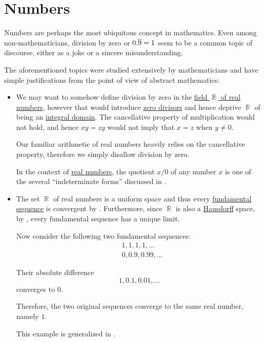 \chapter{Numbers}\label{ch:numbers}

Numbers are perhaps the most ubiquitous concept in mathematics. Even among non-mathematicians, division by zero or \( 0.\oline{9} = 1 \) seem to be a common topic of discourse, either as a joke or a sincere misunderstanding.

The aforementioned topics were studied extensively by mathematicians and have simple justifications from the point of view of abstract mathematics:
\begin{itemize}
  \item We may want to somehow define division by zero in the \hyperref[def:real_numbers]{field \( \BbbR \) of real numbers}, however that would introduce \hyperref[def:divisibility/zero]{zero divisors} and hence deprive \( \BbbR \) of being an \hyperref[def:integral_domain]{integral domain}. The cancellative property of multiplication would not hold, and hence \( xy = zy \) would not imply that \( x = z \) when \( y \neq 0 \).

  Our familiar arithmetic of real numbers heavily relies on the cancellative property, therefore we simply disallow division by zero.

  In the context of \hyperref[def:real_numbers]{real numbers}, the quotient \( x / 0 \) of any number \( x \) is one of the several \enquote{indeterminate forms} discussed in .

  \item The set \( \BbbR \) of real numbers is a uniform space and thus every \hyperref[def:fundamental_net]{fundamental sequence} is convergent by . Furthermore, since \( \BbbR \) is also a \hyperref[def:separation_axioms/T2]{Hausdorff} space, by , every fundamental sequence has a unique limit.

  Now consider the following two fundamental sequences:
  \begin{align*}
    &1, 1, 1, 1, \ldots \\
    &0, 0.9, 0.99, \ldots
  \end{align*}

  Their absolute difference
  \begin{equation*}
    1, 0.1, 0.01, \ldots
  \end{equation*}
  converges to \( 0 \).

  Therefore, the two original sequences converge to the same real number, namely \( 1 \).

  This example is generalized in .
\end{itemize}

